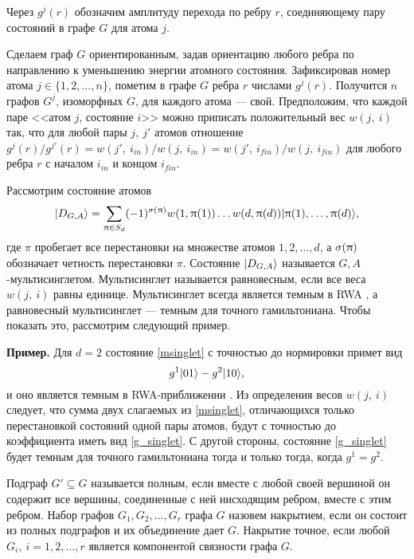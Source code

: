 Через $g^{j}(r)$ обозначим амплитуду перехода по ребру $r$, соединяющему пару состояний в графе $G$ для атома $j$.

Сделаем граф $G$ ориентированным, задав ориентацию любого ребра по направлению к уменьшению энергии атомного состояния. Зафиксировав номер атома $j\in\{ 1,2,\dots,n\}$, пометим в графе $G$ ребра $r$ числами $g^{j}(r)$. Получится $n$ графов $G^{j}$, изоморфных $G$, для каждого атома --- свой. Предположим, что каждой паре <<атом $j$, состояние $i$>> можно приписать положительный вес $w(j,~i)$ так, что для любой пары $j,~j'$ атомов отношение $g^{j}(r)/g^{j'}(r)=w(j',~i_{in})/w(j,~i_{in}) = w(j',~i_{fin})/w(j,~i_{fin})$ для любого ребра $r$ с началом $i_{in}$ и концом $i_{fin}$. 

Рассмотрим состояние атомов
\begin{equation}\label{msinglet}
	|D_{G,A}\rangle = \sum\limits_{\uppi\in S_{d}}(-1)^{\sigma(\uppi)}w(1,\uppi(1))\dots w(d,\uppi(d))|\uppi(1),\dots,\uppi(d)\rangle,
\end{equation}
где $\pi$ пробегает все перестановки на множестве атомов $1,2,\dots,d$, а $\sigma(\uppi)$ обозначает четность перестановки $\pi$. Состояние $|D_{G,A}\rangle$  называется $G,A$-мультисинглетом. Мультисинглет называется равновесным, если все веса $w(j,~i)$ равны единице. Мультисинглет всегда является темным в RWA \cite{ozhigov_qq,rwa_rabi_1,rwa_rabi_2}, а равновесный мультисинглет --- темным для точного гамильтониана. Чтобы показать это, рассмотрим следующий пример.

\textbf{Пример.} Для $d=2$ состояние \eqref{msinglet} с точностью до нормировки примет вид 
\begin{equation}
	\label{g_singlet}
	g^{1}|01\rangle-g^{2}|10\rangle,
\end{equation}
и оно является темным в RWA-приближении \cite{ozhigov_qq,rwa_rabi_1,rwa_rabi_2}. Из определения весов $w(j,~i)$ следует, что сумма двух слагаемых из \eqref{msinglet}, отличающихся только перестановкой состояний одной пары атомов, будут с точностью до коэффициента иметь вид \eqref{g_singlet}. С другой стороны, состояние \eqref{g_singlet} будет темным для точного гамильтониана тогда и только тогда, когда $g^{1}=g^{2}$. 

Подграф $G'\subseteq G$ называется полным, если вместе с любой своей вершиной он содержит все вершины, соединенные с ней нисходящим ребром, вместе с этим ребром. Набор графов $G_{1},G_{2},\dots,G_{r}$ графа $G$ назовем накрытием, если он состоит из полных подграфов и их объединение дает $G$. Накрытие точное, если любой $G_{i},~i=1,2,\dots,r$ является компонентой связности графа $G$. 

